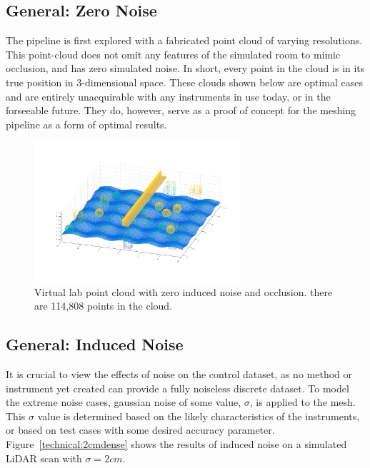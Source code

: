 \documentclass[12pt]{drexelthesis}
\let\Oldsubsection\subsection
\renewcommand{\subsection}{\FloatBarrier\Oldsubsection}
\begin{document}
\subsection{General: Zero Noise}
The pipeline is first explored with a fabricated point cloud of varying resolutions. This point-cloud does not omit any features of the simulated room to mimic occlusion, and has zero simulated noise. In short, every point in the cloud is in its true position in 3-dimensional space. These clouds shown below are optimal cases and are entirely unacquirable with any instruments in use today, or in the forseeable future. They do, however, serve as a proof of concept for the meshing pipeline as a form of optimal results.

\begin{figure}[!ht]
	\centering
	\includegraphics[width=3in]{simulated-lab-scan/full_noiseless_cloud.png}
	\caption[Simulated high density lab point cloud ]{\centering Virtual lab point cloud with zero induced noise and occlusion. there are 114,808 points in the cloud.}
	\label{sim:noiselessdense}
\end{figure}


\subsection{General: Induced Noise}

It is crucial to view the effects of noise on the control dataset, as no method or instrument yet created can provide a fully noiseless discrete dataset. To model the extreme noise cases, gaussian noise of some value, $\sigma$, is applied to the mesh. This $\sigma$ value is determined based on the likely characteristics of the instruments, or based on test cases with some desired accuracy parameter. Figure~\ref{technical:2cmdense} shows the results of induced noise on a simulated LiDAR scan with $\sigma = 2 cm$.
\end{document}
